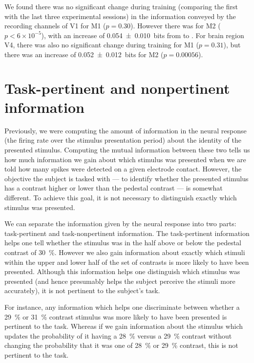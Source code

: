 We found there was no significant change during training (comparing the first with the last three experimental sessions) in the information conveyed by the recording channels of \ac{V1} for \ac{M1} ($p=0.30$).
However there was for \ac{M2} ($p < 6 \times 10^{-5}$), with an increase of \SI{+0.054\pm0.010}{bits} from  to .
For brain region \ac{V4}, there was also no significant change during training for \ac{M1} ($p=0.31$), but there was an increase of \SI{+0.052\pm0.012}{bits} for \ac{M2} ($p=0.00056$).


\section{Task-pertinent and nonpertinent information}
\label{sec:task-info}

Previously, we were computing the amount of information in the neural response (the firing rate over the stimulus presentation period) about the identity of the presented stimulus.
Computing the mutual information between these two tells us how much information we gain about which stimulus was presented when we are told how many spikes were detected on a given electrode contact.
However, the objective the subject is tasked with --- to identify whether the presented stimulus has a contrast higher or lower than the pedestal contrast --- is somewhat different.
To achieve this goal, it is not necessary to distinguish exactly which stimulus was presented.

We can separate the information given by the neural response into two parts: task-pertinent and task-nonpertinent information.
The task-pertinent information helps one tell whether the stimulus was in the half above or below the pedestal contrast of \SI{30}{\percent}.
However we also gain information about exactly which stimuli within the upper and lower half of the set of contrasts is more likely to have been presented.
Although this information helps one distinguish which stimulus was presented (and hence presumably helps the subject perceive the stimuli more accurately), it is not pertinent to the subject's task.

For instance, any information which helps one discriminate between whether a \SI{29}{\percent} or \SI{31}{\percent} contrast stimulus was more likely to have been presented is pertinent to the task.
Whereas if we gain information about the stimulus which updates the probability of it having a \SI{28}{\percent} versus a \SI{29}{\percent} contrast without changing the probability that it was one of \SI{28}{\percent} or \SI{29}{\percent} contrast, this is not pertinent to the task.

